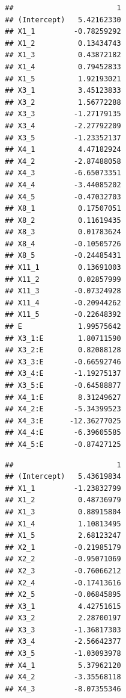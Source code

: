 \begin{knitrout}\scriptsize
	\color{fgcolor}\begin{kframe}
		\begin{alltt}
			  \hlstd{=} \hlstd{,} \hlstd{=}\hlstd{)} 
		\end{alltt}
		\begin{verbatim}
		##                        1
		## (Intercept)   5.42162330
		## X1_1         -0.78259292
		## X1_2          0.13434743
		## X1_3          0.43872182
		## X1_4          0.79452833
		## X1_5          1.92193021
		## X3_1          3.45123833
		## X3_2          1.56772288
		## X3_3         -1.27179135
		## X3_4         -2.27792209
		## X3_5         -1.23352137
		## X4_1          4.47182924
		## X4_2         -2.87488058
		## X4_3         -6.65073351
		## X4_4         -3.44085202
		## X4_5         -0.47032703
		## X8_1          0.17507051
		## X8_2          0.11619435
		## X8_3          0.01783624
		## X8_4         -0.10505726
		## X8_5         -0.24485431
		## X11_1         0.13691003
		## X11_2         0.02857999
		## X11_3        -0.07324928
		## X11_4        -0.20944262
		## X11_5        -0.22648392
		## E             1.99575642
		## X3_1:E        1.80711590
		## X3_2:E        0.82088128
		## X3_3:E       -0.66592746
		## X3_4:E       -1.19275137
		## X3_5:E       -0.64588877
		## X4_1:E        8.31249627
		## X4_2:E       -5.34399523
		## X4_3:E      -12.36277025
		## X4_4:E       -6.39605585
		## X4_5:E       -0.87427125
		\end{verbatim}
		\begin{alltt}
			  \hlstd{=} \hlstd{,}  \hlstd{=} \hlstd{)}
		\end{alltt}
		\begin{verbatim}
		##                        1
		## (Intercept)   5.43619834
		## X1_1         -1.23832799
		## X1_2          0.48736979
		## X1_3          0.88915804
		## X1_4          1.10813495
		## X1_5          2.68123247
		## X2_1         -0.21985179
		## X2_2         -0.95071069
		## X2_3         -0.76066212
		## X2_4         -0.17413616
		## X2_5         -0.06845895
		## X3_1          4.42751615
		## X3_2          2.28700197
		## X3_3         -1.36817303
		## X3_4         -2.56642377
		## X3_5         -1.03093978
		## X4_1          5.37962120
		## X4_2         -3.35568118
		## X4_3         -8.07355346

\end{verbatim}
\end{kframe}
\end{knitrout}
